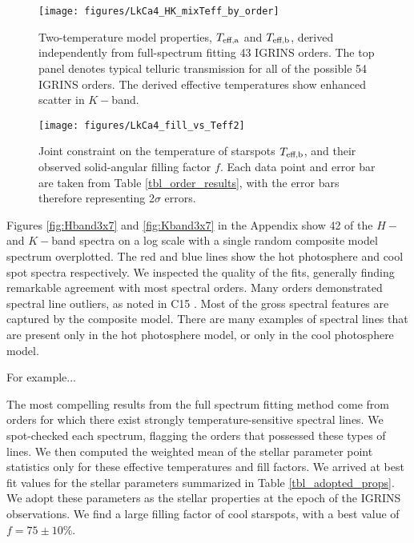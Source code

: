 \documentclass[twocolumn]{emulateapj}%
\newcommand{\iancze}{{\sc C15 }}
\begin{document}


\begin{figure*}
	\centering
	\texttt{[image: figures/LkCa4\_HK\_mixTeff\_by\_order]} 
	\caption{Two-temperature model properties, $T_\textrm{eff,a}$ and $T_\textrm{eff,b}$, derived independently from full-spectrum fitting 43 IGRINS orders.  The top panel denotes typical telluric transmission for all of the possible 54 IGRINS orders.  The derived effective temperatures show enhanced scatter in $K-$band.}
	\label{fig:TwoTempResults}
\end{figure*}



\begin{figure*}
	\centering
	\texttt{[image: figures/LkCa4\_fill\_vs\_Teff2]} 
	\caption{Joint constraint on the temperature of starspots $T_\textrm{eff,b}$, and their observed solid-angular filling factor $f$.  Each data point and error bar are taken from Table \ref{tbl_order_results}, with the error bars therefore representing 2$\sigma$ errors.}
	\label{fig:TwoTempResults}
\end{figure*}

Figures \ref{fig:Hband3x7} and \ref{fig:Kband3x7} in the Appendix show 42 of the $H-$ and $K-$band spectra on a log scale with a single random composite model spectrum overplotted.  The red and blue lines show the hot photosphere and cool spot spectra respectively.  We inspected the quality of the fits, generally finding remarkable agreement with most spectral orders.  Many orders demonstrated spectral line outliers, as noted in \iancze.  Most of the gross spectral features are captured by the composite model.  There are many examples of spectral lines that are present only in the hot photosphere model, or only in the cool photosphere model.  

For example...


The most compelling results from the full spectrum fitting method come from orders for which there exist strongly temperature-sensitive spectral lines.  We spot-checked each spectrum, flagging the orders that possessed these types of lines.  We then computed the weighted mean of the stellar parameter point statistics only for these effective temperatures and fill factors.  We arrived at best fit values for the stellar parameters summarized in Table \ref{tbl_adopted_props}.  We adopt these parameters as the stellar properties at the epoch of the IGRINS observations.  We find a large filling factor of cool starspots, with a best value of $f=75\pm 10 \% $.
\end{document}
